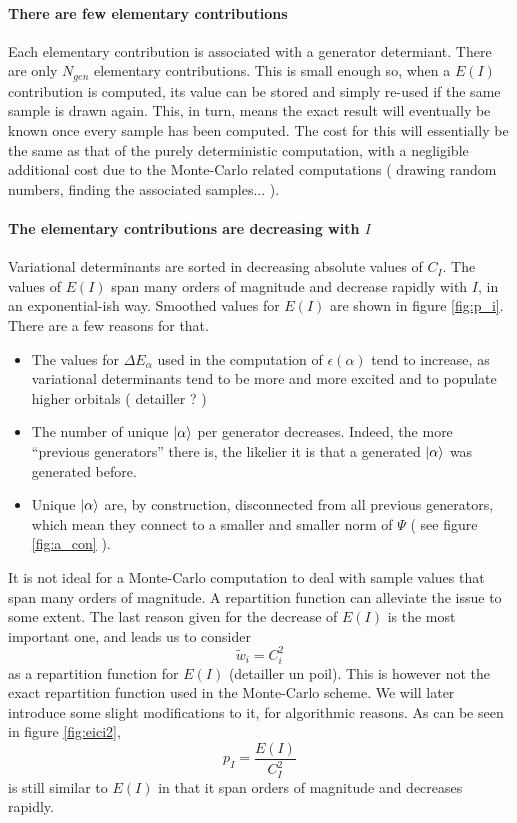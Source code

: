\documentclass[./thesis.tex]{subfiles}
\begin{document}
\paragraph{There are few elementary contributions}
Each elementary contribution is associated with a generator determiant. There are only $N_{gen}$ elementary contributions. This is small enough so, when a $E(I)$ contribution is computed, its value can be stored and simply re-used if the same sample is drawn again. This, in turn, means the exact result will eventually be known once every sample has been computed. The cost for this will essentially be the same as that of the purely deterministic computation, with a negligible additional cost due to the Monte-Carlo related computations ( drawing random numbers, finding the associated samples... ).

\paragraph{The elementary contributions are decreasing with $I$}
	Variational determinants are sorted in decreasing absolute values of $C_I$.
	The values of $E(I)$ span many orders of magnitude and decrease rapidly with $I$, in an exponential-ish way. Smoothed values for $E(I)$ are shown in figure \ref{fig:p_i}. There are a few reasons for that.
\begin{itemize}
	\item
	The values for $\Delta E_\alpha$ used in the computation of $\epsilon(\alpha)$ tend to increase, as variational determinants tend to be more and more excited and to populate higher orbitals ( detailler ? )
	\item
	The number of unique $\ket \alpha$ per generator decreases. Indeed, the more ``previous generators'' there is, the likelier it is that a generated $\ket \alpha$ was generated before.
	\item
	Unique $\ket \alpha$ are, by construction, disconnected from all previous generators, which mean they connect to a smaller and smaller norm of $\Psi$ ( see figure \ref{fig:a_con} ). 
\end{itemize}
It is not ideal for a Monte-Carlo computation to deal with sample values that span many orders of magnitude. A repartition function can alleviate the issue to some extent.
The last reason given for the decrease of $E(I)$ is the most important one, and leads us to consider
$$\tilde w_i = C_i^2$$
as a repartition function for $E(I)$ (detailler un poil). This is however not the exact repartition function used in the Monte-Carlo scheme. We will later introduce some slight modifications to it, for algorithmic reasons. As can be seen in figure \ref{fig:eici2}, $$p_I = \frac{E(I)}{C_I^2}$$ is  still similar to $E(I)$ in that it span orders of magnitude and decreases rapidly.
\end{document}
